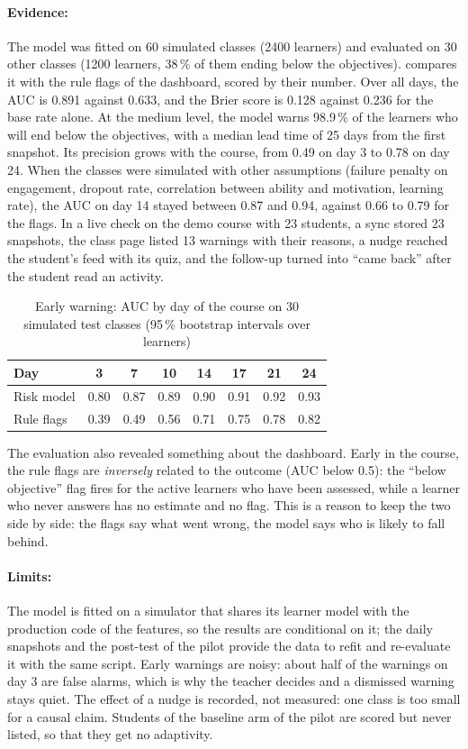 \paragraph{Evidence:} The model was fitted on 60 simulated classes
(2400 learners) and evaluated on 30 other classes (1200 learners, 38\,\%
of them ending below the objectives).  compares it with
the rule flags of the dashboard, scored by their number. Over all days,
the AUC is 0.891 against 0.633, and the Brier score is 0.128 against
0.236 for the base rate alone. At the medium level, the model warns
98.9\,\% of the learners who will end below the objectives, with a median
lead time of 25 days from the first snapshot. Its precision grows with the
course, from 0.49 on day 3 to 0.78 on day 24. When the classes were
simulated with other assumptions (failure penalty on engagement, dropout
rate, correlation between ability and motivation, learning rate), the AUC
on day 14 stayed between 0.87 and 0.94, against 0.66 to 0.79 for the
flags. In a live check on the demo course with 23 students, a sync stored
23 snapshots, the class page listed 13 warnings with their reasons, a
nudge reached the student's feed with its quiz, and the follow-up turned
into ``came back'' after the student read an activity.

\begin{table}[htbp]
\centering
\caption{Early warning: AUC by day of the course on 30 simulated test
classes (95\,\% bootstrap intervals over learners)}
\label{tab-risk-auc}
\small
\begin{tabular}{@{}lccccccc@{}}
\toprule
\textbf{Day} & 3 & 7 & 10 & 14 & 17 & 21 & 24 \\
\midrule
Risk model & 0.80 & 0.87 & 0.89 & 0.90 & 0.91 & 0.92 & 0.93 \\
Rule flags & 0.39 & 0.49 & 0.56 & 0.71 & 0.75 & 0.78 & 0.82 \\
\bottomrule
\end{tabular}
\end{table}

The evaluation also revealed something about the dashboard. Early in the
course, the rule flags are \emph{inversely} related to the outcome (AUC
below 0.5): the ``below objective'' flag fires for the active learners who
have been assessed, while a learner who never answers has no estimate and
no flag. This is a reason to keep the two side by side: the flags say what
went wrong, the model says who is likely to fall behind.

\paragraph{Limits:} The model is fitted on a simulator that shares its
learner model with the production code of the features, so the results
are conditional on it; the daily snapshots and the post-test of the pilot
provide the data to refit and re-evaluate it with the same script. Early
warnings are noisy: about half of the warnings on day 3 are false alarms,
which is why the teacher decides and a dismissed warning stays quiet. The
effect of a nudge is recorded, not measured: one class is too small for a
causal claim. Students of the baseline arm of the pilot are scored but
never listed, so that they get no adaptivity.

